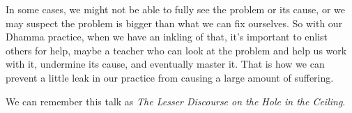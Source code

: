 In some cases, we might not be able to fully see the problem or its 
cause, or we may suspect the problem is bigger than what we can fix 
ourselves. So with our Dhamma practice, when we have an inkling of 
that, it's important to enlist others for help, maybe a teacher who can 
look at the problem and help us work with it, undermine its cause, and 
eventually master it. That is how we can prevent a little leak in our 
practice from causing a large amount of suffering.

We can remember this talk as \emph{The Lesser Discourse on the Hole in 
the Ceiling}.

